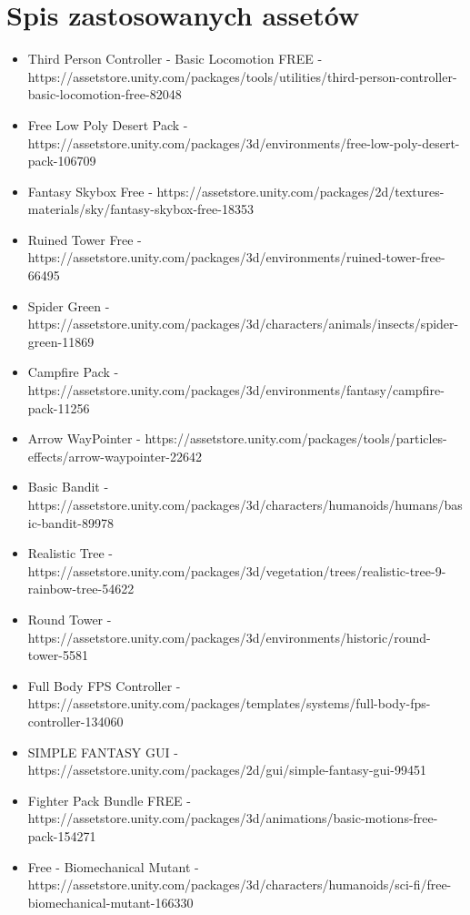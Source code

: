 \documentclass[10pt,a4paper]{article}
\begin{document}
\begin{description}
\begin{itemize}
	\end{itemize}
\end{description}

\clearpage
\section{Spis zastosowanych assetów}
\vspace{0.5cm}
\begin{itemize}
	\item Third Person Controller - Basic Locomotion FREE - https://assetstore.unity.com/packages/tools/utilities/third-person-controller-basic-locomotion-free-82048
	\item Free Low Poly Desert Pack - https://assetstore.unity.com/packages/3d/environments/free-low-poly-desert-pack-106709
	\item Fantasy Skybox Free - https://assetstore.unity.com/packages/2d/textures-materials/sky/fantasy-skybox-free-18353
 	\item Ruined Tower Free - https://assetstore.unity.com/packages/3d/environments/ruined-tower-free-66495
	\item Spider Green - https://assetstore.unity.com/packages/3d/characters/animals/insects/spider-green-11869
	\item Campfire Pack - https://assetstore.unity.com/packages/3d/environments/fantasy/campfire-pack-11256
	\item Arrow WayPointer - https://assetstore.unity.com/packages/tools/particles-effects/arrow-waypointer-22642
  	\item Basic Bandit - https://assetstore.unity.com/packages/3d/characters/humanoids/humans/basic-bandit-89978
  	\item Realistic Tree - https://assetstore.unity.com/packages/3d/vegetation/trees/realistic-tree-9-rainbow-tree-54622
  	\item Round Tower - https://assetstore.unity.com/packages/3d/environments/historic/round-tower-5581
	\item Full Body FPS Controller - https://assetstore.unity.com/packages/templates/systems/full-body-fps-controller-134060
	\item SIMPLE FANTASY GUI - https://assetstore.unity.com/packages/2d/gui/simple-fantasy-gui-99451
	\item Fighter Pack Bundle FREE - https://assetstore.unity.com/packages/3d/animations/basic-motions-free-pack-154271
	\item Free - Biomechanical Mutant - https://assetstore.unity.com/packages/3d/characters/humanoids/sci-fi/free-biomechanical-mutant-166330
\end{itemize}
\end{document}

